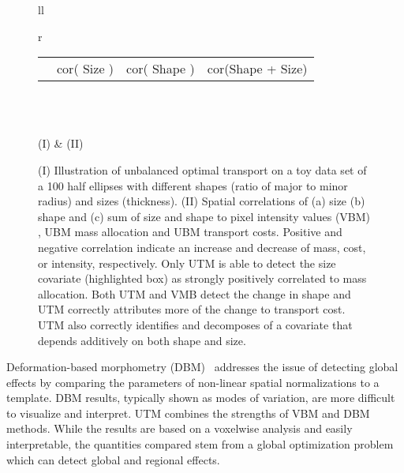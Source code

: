 \documentclass{llncs}
\begin{document}
\begin{figure}[t!]
\begin{tabular}{ll}
\begin{tabular}{r}
\begin{tabular}{l|c|c|c}
  \raisebox{-2mm}{\texttt{[image: cor-rx-ry-mass-mass]} }\\ \hline 
	& cor( Size ) 
	& cor( Shape )
	& cor(Shape + Size)
\end{tabular}\\
\end{tabular}\\
  (I) & (II) \\
\end{tabular}
\caption{\label{fig:cor-ellipse}
(I) Illustration of unbalanced optimal transport on a toy data set of a 100
half ellipses with different shapes (ratio of major to minor radius) and sizes
(thickness).  (II) Spatial correlations of (a) size (b) shape and (c) sum of
size and shape to pixel intensity values (VBM) , UBM mass allocation and UBM
transport costs.  Positive and negative correlation indicate an increase and
decrease of mass, cost, or intensity, respectively. Only UTM is able to detect
the size covariate (highlighted box) as strongly positively correlated to mass
allocation.  Both UTM and VMB detect the change in shape and UTM correctly
attributes more of the change to transport cost. UTM also correctly identifies
and decomposes of a covariate that depends additively on both shape and size. 
\vspace{-7mm}
}
\end{figure}

Deformation-based morphometry (DBM)~\cite{ashburner1998identifying} addresses
the issue of detecting global effects by comparing the parameters of non-linear
spatial normalizations to a template.  DBM results, typically shown as modes of
variation, are more difficult to visualize and interpret.  UTM combines the
strengths of VBM and DBM methods.  While the results are based on a voxelwise
analysis and easily interpretable, the quantities compared stem from a global
optimization problem which can detect global and regional effects.  
\end{document}
